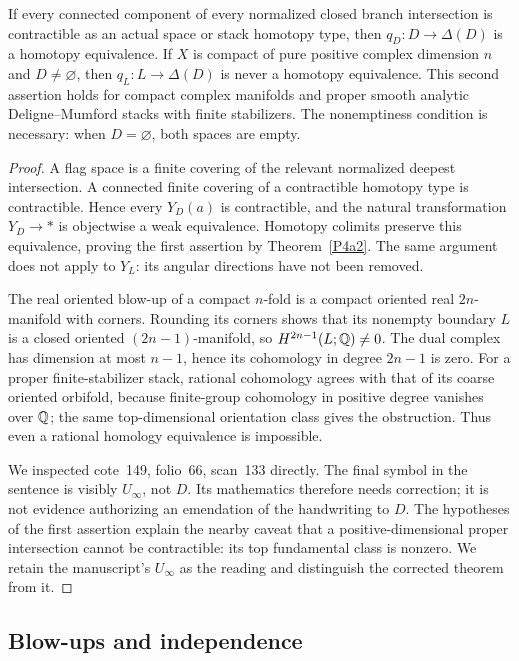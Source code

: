\begin{theorem}
\label{P4b}
If every connected component of every normalized closed branch intersection is contractible as an actual space or stack homotopy type, then $q_D:D\to\Delta(D)$ is a homotopy equivalence.  If $X$ is compact of pure positive complex dimension $n$ and $D\ne\varnothing$, then $q_L:L\to\Delta(D)$ is never a homotopy equivalence.  This second assertion holds for compact complex manifolds and proper smooth analytic Deligne--Mumford stacks with finite stabilizers.  The nonemptiness condition is necessary: when $D=\varnothing$, both spaces are empty.
\end{theorem}
\begin{proof}
A flag space is a finite covering of the relevant normalized deepest intersection.  A connected finite covering of a contractible homotopy type is contractible.  Hence every $Y_D(a)$ is contractible, and the natural transformation $Y_D\to *$ is objectwise a weak equivalence.  Homotopy colimits preserve this equivalence, proving the first assertion by Theorem~\ref{P4a2}.  The same argument does not apply to $Y_L$: its angular directions have not been removed.

The real oriented blow-up of a compact $n$-fold is a compact oriented real $2n$-manifold with corners.  Rounding its corners shows that its nonempty boundary $L$ is a closed oriented $(2n-1)$-manifold, so $H^{2n-1}(L;\mathbb Q)\ne0$.  The dual complex has dimension at most $n-1$, hence its cohomology in degree $2n-1$ is zero.  For a proper finite-stabilizer stack, rational cohomology agrees with that of its coarse oriented orbifold, because finite-group cohomology in positive degree vanishes over $\mathbb Q$; the same top-dimensional orientation class gives the obstruction.  Thus even a rational homology equivalence is impossible.

We inspected cote~149, folio~66, scan~133 directly.  The final symbol in the sentence is visibly $U_\infty$, not $D$.  Its mathematics therefore needs correction; it is not evidence authorizing an emendation of the handwriting to $D$.  The hypotheses of the first assertion explain the nearby caveat that a positive-dimensional proper intersection cannot be contractible: its top fundamental class is nonzero.  We retain the manuscript's $U_\infty$ as the reading and distinguish the corrected theorem from it.
\end{proof}

\subsection{Blow-ups and independence}

